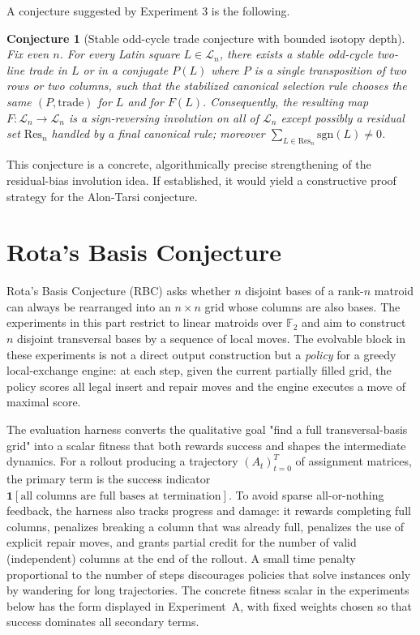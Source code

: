 \documentclass[11pt]{amsart}
\newtheorem{conjecture}{Conjecture}
\newcommand{\sgn}{\mathrm{sgn}}
\newcommand{\Ln}{\mathcal{L}_n}
\newcommand{\Res}{\mathrm{Res}}
\begin{document}
A conjecture suggested by Experiment 3 is the following.
\begin{conjecture}[Stable odd-cycle trade conjecture with bounded isotopy depth]
Fix even $n$. For every Latin square $L\in\Ln$, there exists a stable odd-cycle two-line trade in $L$ or in a conjugate $P(L)$ where $P$ is a single transposition of two rows or two columns, such that the stabilized canonical selection rule chooses the same $(P,\text{trade})$ for $L$ and for $F(L)$.
Consequently, the resulting map $F:\Ln\to\Ln$ is a sign-reversing involution on all of $\Ln$ except possibly a residual set $\Res_n$ handled by a final canonical rule; moreover $\sum_{L\in\Res_n}\sgn(L)\neq 0$.
\end{conjecture}

This conjecture is a concrete, algorithmically precise strengthening of the residual-bias involution idea.
If established, it would yield a constructive proof strategy for the Alon-Tarsi conjecture.

\section{Rota's Basis Conjecture}
\label{sec:partIIIintro}

Rota's Basis Conjecture (RBC) asks whether $n$ disjoint bases of a rank-$n$ matroid can always be rearranged into an $n\times n$ grid whose columns are also bases.
The experiments in this part restrict to linear matroids over $\mathbb{F}_2$ and aim to construct $n$ disjoint transversal bases by a sequence of local moves.
The evolvable block in these experiments is not a direct output construction but a \emph{policy} for a greedy local-exchange engine: at each step, given the current partially filled grid, the policy scores all legal insert and repair moves and the engine executes a move of maximal score.

The evaluation harness converts the qualitative goal "find a full transversal-basis grid" into a scalar fitness that both rewards success and shapes the intermediate dynamics.
For a rollout producing a trajectory $(A_t)_{t=0}^T$ of assignment matrices, the primary term is the success indicator $\mathbf{1}[\text{all columns are full bases at termination}]$.
To avoid sparse all-or-nothing feedback, the harness also tracks progress and damage: it rewards completing full columns, penalizes breaking a column that was already full, penalizes the use of explicit repair moves, and grants partial credit for the number of valid (independent) columns at the end of the rollout.
A small time penalty proportional to the number of steps discourages policies that solve instances only by wandering for long trajectories.
The concrete fitness scalar in the experiments below has the form displayed in Experiment~A, with fixed weights chosen so that success dominates all secondary terms.
\end{document}
